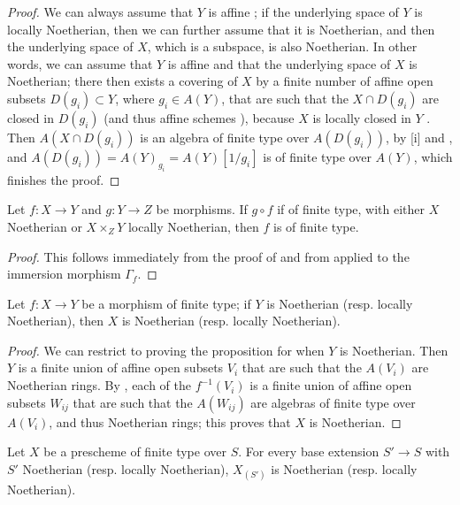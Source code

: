 \begin{proof}
\label{proof-I.6.3.5}
We can always assume that $Y$ is affine ;
if the underlying space of $Y$ is locally Noetherian, then we can further assume that it is Noetherian, and then the underlying space of $X$, which is a subspace, is also Noetherian.
In other words, we can assume that $Y$ is affine and that the underlying space of $X$ is Noetherian;
there then exists a covering of $X$ by a finite number of affine open subsets $D(g_i)\subset Y$, where $g_i\in A(Y)$, that are such that the $X\cap D(g_i)$ are closed in $D(g_i)$ (and thus affine schemes ), because $X$ is locally closed in $Y$ .
Then $A(X\cap D(g_i))$ is an algebra of finite type over $A(D(g_i))$, by [i] and , and $A(D(g_i))=A(Y)_{g_i}=A(Y)[1/g_i]$ is of finite type over $A(Y)$, which finishes the proof.
\end{proof}

\begin{corollary}[6.3.6]
\label{I.6.3.6}
Let $f:X\to Y$ and $g:Y\to Z$ be morphisms.
If $g\circ f$ if of finite type, with either $X$ Noetherian or $X\times_Z Y$ locally Noetherian, then $f$ is of finite type.
\end{corollary}

\begin{proof}
\label{proof-I.6.3.6}
This follows immediately from the proof of  and from  applied to the immersion morphism $\Gamma_f$.
\end{proof}

\begin{proposition}[6.3.7]
\label{I.6.3.7}
Let $f:X\to Y$ be a morphism of finite type;
if $Y$ is Noetherian (resp. locally Noetherian), then $X$ is Noetherian (resp. locally Noetherian).
\end{proposition}

\begin{proof}
\label{proof-I.6.3.7}
We can restrict to proving the proposition for when $Y$ is Noetherian.
Then $Y$ is a finite union of affine open subsets $V_i$ that are such that the $A(V_i)$ are Noetherian rings.
By , each of the $f^{-1}(V_i)$ is a finite union of affine open subsets $W_{ij}$ that are such that the $A(W_{ij})$ are algebras of finite type over $A(V_i)$, and thus Noetherian rings;
this proves that $X$ is Noetherian.
\end{proof}

\begin{corollary}[6.3.8]
\label{I.6.3.8}
Let $X$ be a prescheme of finite type over $S$.
For every base extension $S'\to S$ with $S'$ Noetherian (resp. locally Noetherian), $X_{(S')}$ is Noetherian (resp. locally Noetherian).
\end{corollary}

